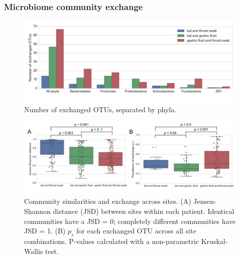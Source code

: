 \documentclass[12pt]{article}
\begin{document}
\subsubsection{Microbiome community exchange}

\begin{figure}
\begin{center}
	\includegraphics[scale=0.6]{shared_phyla}
	\caption{Number of exchanged OTUs, separated by phyla.}
	\label{fig:shared_phyla}
\end{center}
\end{figure}

\begin{figure}
\begin{center}
	\includegraphics[scale=0.7]{all_jsd_sharedness}
	\caption{Community similarities and exchange across sites.
	(A) Jensen-Shannon distance (JSD) between sites within each patient. 
	Identical communities have a JSD = 0; completely different
	communities have JSD = 1. (B) $p_s$ for each exchanged OTU across 
	all site combinations. P-values calculated with a
	non-parametric Kruskal-Wallis test.}
	\label{fig:similarities}
\end{center}
\end{figure}
\end{document}
